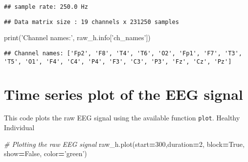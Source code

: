 \documentclass[]{book}
\newenvironment{Shaded}{\begin{snugshade}}{\end{snugshade}}
\newcommand{\BuiltInTok}[1]{#1}
\newcommand{\CommentTok}[1]{\textcolor[rgb]{0.56,0.35,0.01}{\textit{#1}}}
\newcommand{\DecValTok}[1]{\textcolor[rgb]{0.00,0.00,0.81}{#1}}
\newcommand{\NormalTok}[1]{#1}
\newcommand{\OperatorTok}[1]{\textcolor[rgb]{0.81,0.36,0.00}{\textbf{#1}}}
\newcommand{\SpecialCharTok}[1]{\textcolor[rgb]{0.00,0.00,0.00}{#1}}
\newcommand{\StringTok}[1]{\textcolor[rgb]{0.31,0.60,0.02}{#1}}
\newcommand{\VariableTok}[1]{\textcolor[rgb]{0.00,0.00,0.00}{#1}}
\begin{document}
\begin{verbatim}
## sample rate: 250.0 Hz
\end{verbatim}

\begin{Shaded}
\end{Shaded}

\begin{verbatim}
## Data matrix size : 19 channels x 231250 samples
\end{verbatim}

\begin{Shaded}
\begin{Highlighting}[]
\BuiltInTok{print}\NormalTok{(}\StringTok{'Channel names:'}\NormalTok{, raw_h.info[}\StringTok{'ch_names'}\NormalTok{])}
\end{Highlighting}
\end{Shaded}

\begin{verbatim}
## Channel names: ['Fp2', 'F8', 'T4', 'T6', 'O2', 'Fp1', 'F7', 'T3', 'T5', 'O1', 'F4', 'C4', 'P4', 'F3', 'C3', 'P3', 'Fz', 'Cz', 'Pz']
\end{verbatim}

\hypertarget{time-series-plot-of-the-eeg-signal}{%
\section{Time series plot of the EEG signal}\label{time-series-plot-of-the-eeg-signal}}

This code plots the raw EEG signal using the available function \texttt{plot}.
Healthy Individual

\begin{Shaded}
\begin{Highlighting}[]
\CommentTok{# Plotting the raw EEG signal}
\NormalTok{raw_h.plot(start}\OperatorTok{=}\DecValTok{300}\NormalTok{,duration}\OperatorTok{=}\DecValTok{2}\NormalTok{, block}\OperatorTok{=}\VariableTok{True}\NormalTok{, show}\OperatorTok{=}\VariableTok{False}\NormalTok{, color}\OperatorTok{=}\StringTok{'green'}\NormalTok{)}
\end{Highlighting}
\end{Shaded}
\end{document}
